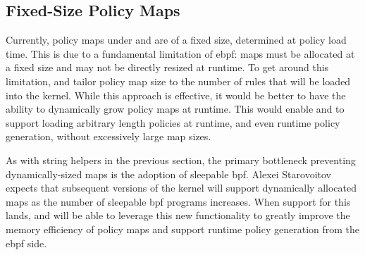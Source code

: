 \subsection{Fixed-Size Policy Maps}

Currently, policy maps under \bpfbox{} and \bpfcontain{} are of a fixed size, determined
at policy load time. This is due to a fundamental limitation of \gls{ebpf}: maps must be
allocated at a fixed size and may not be directly resized at runtime. To get around this
limitation, \bpfbox{} and \bpfcontain{} tailor policy map size to the number of rules that
will be loaded into the kernel. While this approach is effective, it would be better to
have the ability to dynamically grow policy maps at runtime. This would enable \bpfbox{}
and \bpfcontain{} to support loading arbitrary length policies at runtime, and even
runtime policy generation, without excessively large map sizes.

As with string helpers in the previous section, the primary bottleneck preventing
dynamically-sized maps is the adoption of sleepable \gls{bpf}. Alexei Starovoitov expects
that subsequent versions of the kernel will support dynamically allocated maps as the
number of sleepable \gls{bpf} programs increases. When support for this lands, \bpfbox{}
and \bpfcontain{} will be able to leverage this new functionality to greatly improve the
memory efficiency of policy maps and support runtime policy generation from the \gls{ebpf}
side.


